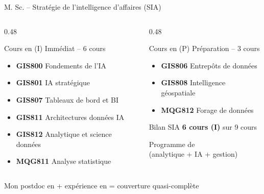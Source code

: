 \documentclass[aspectratio=169,11pt]{beamer}
\begin{document}
\begin{frame}{M. Sc. -- Stratégie de l'intelligence d'affaires (SIA)}
  \scriptsize
  \begin{columns}[T]
    \begin{column}{0.48\textwidth}
      \begin{block}{Cours en (I) Immédiat -- 6 cours}
        \begin{itemize}
          \item[\textcolor{immediatgreen}{I}] \textbf{GIS800} Fondements de l'IA
          \item[\textcolor{immediatgreen}{I}] \textbf{GIS801} IA stratégique
          \item[\textcolor{immediatgreen}{I}] \textbf{GIS807} Tableaux de bord et BI
          \item[\textcolor{immediatgreen}{I}] \textbf{GIS811} Architectures données IA
          \item[\textcolor{immediatgreen}{I}] \textbf{GIS812} Analytique et science données
          \item[\textcolor{immediatgreen}{I}] \textbf{MQG811} Analyse statistique
        \end{itemize}
      \end{block}
    \end{column}
    \begin{column}{0.48\textwidth}
      \begin{block}{Cours en (P) Préparation -- 3 cours}
        \begin{itemize}
          \item[\textcolor{prepareorange}{P}] \textbf{GIS806} Entrepôts de données
          \item[\textcolor{prepareorange}{P}] \textbf{GIS808} Intelligence géospatiale
          \item[\textcolor{prepareorange}{P}] \textbf{MQG812} Forage de données
        \end{itemize}
      \end{block}
      
      \vspace{0.5em}
      
      \begin{alertblock}{Bilan SIA}
        \centering
        \textbf{6 cours (I)} sur 9 cours
        
        \vspace{0.3em}
        
        {\small Programme de \\(analytique + IA + gestion)}
      \end{alertblock}
    \end{column}
  \end{columns}
  
  \vspace{0.3em}
  
  \begin{center}
    {\small Mon postdoc en  + expérience en  = couverture quasi-complète}
  \end{center}
\end{frame}
\end{document}
